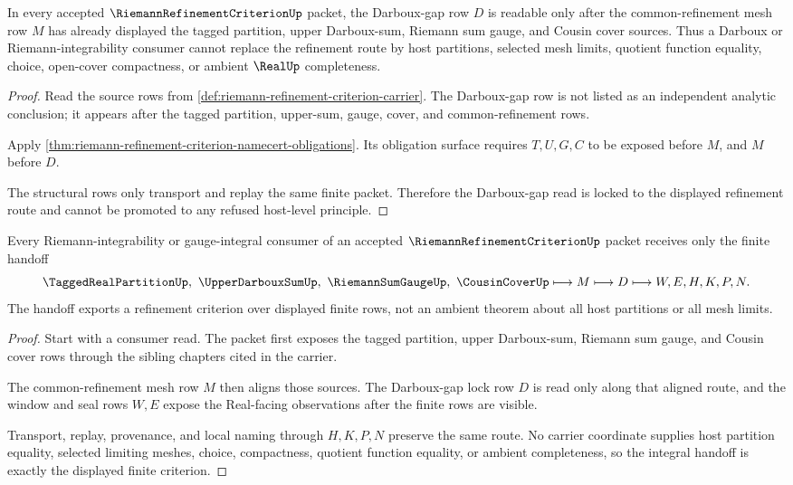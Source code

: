 \begin{theorem}
\label{thm:riemann-refinement-criterion-darboux-gap-lock}
In every accepted $\RiemannRefinementCriterionUp$ packet, the Darboux-gap row $D$ is readable only after the common-refinement mesh row $M$ has already displayed the tagged partition, upper Darboux-sum, Riemann sum gauge, and Cousin cover sources. Thus a Darboux or Riemann-integrability consumer cannot replace the refinement route by host partitions, selected mesh limits, quotient function equality, choice, open-cover compactness, or ambient $\RealUp$ completeness.
\end{theorem}
\begin{proof}
Read the source rows from \autoref{def:riemann-refinement-criterion-carrier}. The Darboux-gap row is not listed as an independent analytic conclusion; it appears after the tagged partition, upper-sum, gauge, cover, and common-refinement rows.

Apply \autoref{thm:riemann-refinement-criterion-namecert-obligations}. Its obligation surface requires $T,U,G,C$ to be exposed before $M$, and $M$ before $D$.

The structural rows only transport and replay the same finite packet. Therefore the Darboux-gap read is locked to the displayed refinement route and cannot be promoted to any refused host-level principle.
\end{proof}

\begin{theorem}
\label{thm:riemann-refinement-criterion-integral-handoff}
Every Riemann-integrability or gauge-integral consumer of an accepted $\RiemannRefinementCriterionUp$ packet receives only the finite handoff
$$
\TaggedRealPartitionUp,\ \UpperDarbouxSumUp,\ \RiemannSumGaugeUp,\ \CousinCoverUp
\longmapsto M \longmapsto D \longmapsto W,E,H,K,P,N .
$$
The handoff exports a refinement criterion over displayed finite rows, not an ambient theorem about all host partitions or all mesh limits.
\end{theorem}
\begin{proof}
Start with a consumer read. The packet first exposes the tagged partition, upper Darboux-sum, Riemann sum gauge, and Cousin cover rows through the sibling chapters cited in the carrier.

The common-refinement mesh row $M$ then aligns those sources. The Darboux-gap lock row $D$ is read only along that aligned route, and the window and seal rows $W,E$ expose the Real-facing observations after the finite rows are visible.

Transport, replay, provenance, and local naming through $H,K,P,N$ preserve the same route. No carrier coordinate supplies host partition equality, selected limiting meshes, choice, compactness, quotient function equality, or ambient completeness, so the integral handoff is exactly the displayed finite criterion.
\end{proof}


